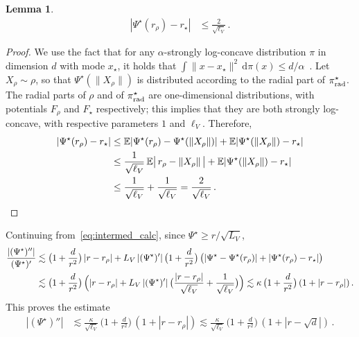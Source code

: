 \documentclass[twoside]{article}
\newcommand{\1}{\mathds{1}}
\newcommand*{\E}{\mathbb E}
\newcommand*{\rd}{\mathrm{d}}
\newcommand*{\dd}{\, \rd}
\newcommand{\pirad}{\pi_{\rm rad}}
\theoremstyle{plain}
\newtheorem{lemma}[theorem]{Lemma}
\theoremstyle{definition}
\theoremstyle{remark}
\begin{document}
\begin{lemma}
    \begin{align*}
        |\Psi^\star(r_\rho) - r_\star|
        &\le \frac{2}{\sqrt{\ell_V}}\,.
    \end{align*}
\end{lemma}
\begin{proof}
    We use the fact that for any $\alpha$-strongly log-concave distribution $\pi$ in dimension $d$ with mode $x_\star$, it holds that $\int \|x-x_\star\|^2\dd \pi(x) \le d/\alpha$~\citep[c.f.][``basic lemma'']{ChewiBook}.
    Let $X_\rho \sim \rho$, so that $\Psi^\star(\|X_\rho\|)$ is distributed according to the radial part of $\pirad^\star$.
    The radial parts of $\rho$ and of $\pirad^\star$ are one-dimensional distributions, with potentials $F_\rho$ and $F_\star$ respectively; this implies that they are both strongly log-concave, with respective parameters $1$ and $\ell_V$.
    Therefore,
    \begin{align*}
        |\Psi^\star(r_\rho) - r_\star|
        &\le \E|\Psi^\star(r_\rho) - \Psi^\star(\|X_\rho\|)| + \E|\Psi^\star(\|X_\rho\|) - r_\star|\\
        &\le \frac{1}{\sqrt{\ell_V}}\,\E\bigl\lvert\,r_\rho - \|X_\rho\|\,\bigr\rvert + \E|\Psi^\star(\|X_\rho\|) - r_\star| \\
        &\le \frac{1}{\sqrt{\ell_V}} + \frac{1}{\sqrt{\ell_V}}
        = \frac{2}{\sqrt{\ell_V}}\,. \qedhere
    \end{align*}
\end{proof}

Continuing from~\eqref{eq:intermed_calc}, since $\Psi^\star \ge r/\sqrt{L_V}$,
\begin{align*}
    \frac{|(\Psi^\star)''|}{(\Psi^\star)'}
    &\lesssim \bigl(1 + \frac{d}{r^2}\bigr)\,|r-r_\rho| + L_V\, |(\Psi^\star)'|\, \bigl(1 + \frac{d}{r^2}\bigr)\,\bigl(|\Psi^\star - \Psi^\star(r_\rho)| + |\Psi^\star(r_\rho) - r_\star|\bigr) \\
    &\lesssim \bigl(1 + \frac{d}{r^2}\bigr)\,\Bigl(|r-r_\rho| + L_V\,|(\Psi^\star)'|\,\bigl(\frac{|r-r_\rho|}{\sqrt{\ell_V}} + \frac{1}{\sqrt{\ell_V}}\bigr)\Bigr)
    \lesssim \kappa\,\bigl(1 + \frac{d}{r^2}\bigr)\,(1+|r-r_\rho|)\,.
\end{align*}
This proves the estimate
\begin{align*}
    |(\Psi^\star)''|
    &\lesssim \frac{\kappa}{\sqrt{\ell_V}}\,\bigl(1 + \frac{d}{r^2}\bigr)\,(1+|r-r_\rho|)
    \lesssim \frac{\kappa}{\sqrt{\ell_V}}\,\bigl(1 + \frac{d}{r^2}\bigr)\,(1+|r-\sqrt d|)\,.
\end{align*}
\end{document}
